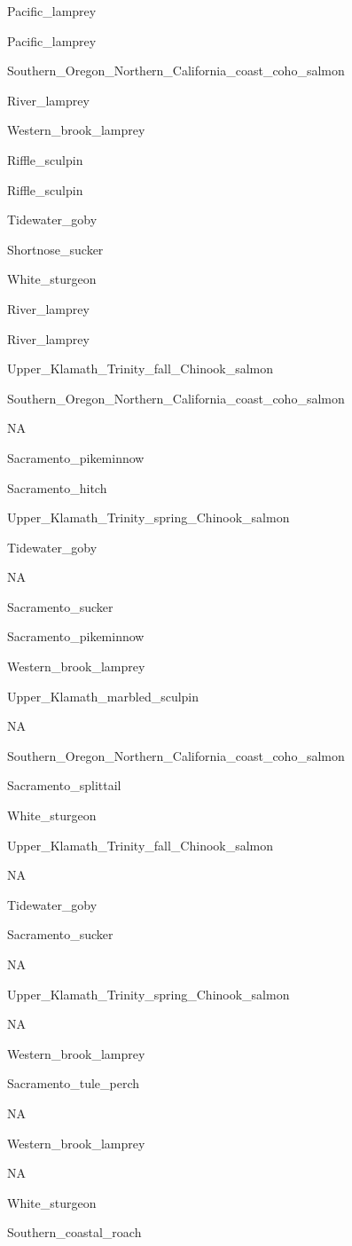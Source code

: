 \documentclass[]{article}
\begin{document}
Pacific\_lamprey

Pacific\_lamprey

Southern\_Oregon\_Northern\_California\_coast\_coho\_salmon

River\_lamprey

Western\_brook\_lamprey

Riffle\_sculpin

Riffle\_sculpin

Tidewater\_goby

Shortnose\_sucker

White\_sturgeon

River\_lamprey

River\_lamprey

Upper\_Klamath\_Trinity\_fall\_Chinook\_salmon

Southern\_Oregon\_Northern\_California\_coast\_coho\_salmon

NA

Sacramento\_pikeminnow

Sacramento\_hitch

Upper\_Klamath\_Trinity\_spring\_Chinook\_salmon

Tidewater\_goby

NA

Sacramento\_sucker

Sacramento\_pikeminnow

Western\_brook\_lamprey

Upper\_Klamath\_marbled\_sculpin

NA

Southern\_Oregon\_Northern\_California\_coast\_coho\_salmon

Sacramento\_splittail

White\_sturgeon

Upper\_Klamath\_Trinity\_fall\_Chinook\_salmon

NA

Tidewater\_goby

Sacramento\_sucker

NA

Upper\_Klamath\_Trinity\_spring\_Chinook\_salmon

NA

Western\_brook\_lamprey

Sacramento\_tule\_perch

NA

Western\_brook\_lamprey

NA

White\_sturgeon

Southern\_coastal\_roach
\end{document}
